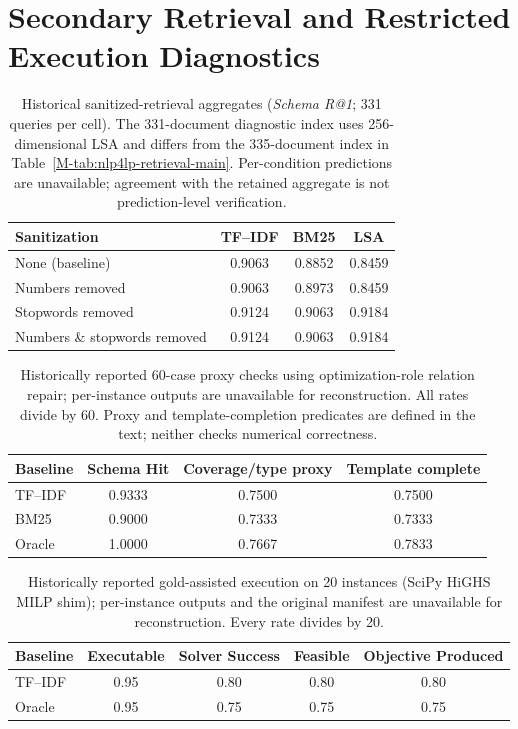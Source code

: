\documentclass[pdflatex,sn-basic,Numbered]{sn-jnl}
\begin{document}
\section{Secondary Retrieval and Restricted Execution Diagnostics}
\begin{table}[htbp]
\centering
\caption{Historical sanitized-retrieval aggregates (\textit{Schema R@1}; 331 queries per cell). The 331-document diagnostic index uses 256-dimensional LSA and differs from the 335-document index in Table~\ref{M-tab:nlp4lp-retrieval-main}. Per-condition predictions are unavailable; agreement with the retained aggregate is not prediction-level verification.}
\label{tab:nlp4lp-overlap}
\small
\begin{tabular}{lccc}
  \toprule
  Sanitization & TF--IDF & BM25 & LSA \\
  \midrule
  None (baseline)               & 0.9063 & 0.8852 & 0.8459 \\
  Numbers removed               & 0.9063 & 0.8973 & 0.8459 \\
  Stopwords removed             & 0.9124 & 0.9063 & 0.9184 \\
  Numbers \& stopwords removed  & 0.9124 & 0.9063 & 0.9184 \\
  \bottomrule
\end{tabular}
\end{table}
\begin{table}[htbp]
\centering
\caption{Historically reported 60-case proxy checks using optimization-role relation repair; per-instance outputs are unavailable for reconstruction. All rates divide by 60. Proxy and template-completion predicates are defined in the text; neither checks numerical correctness.}
\label{tab:eng-structural}
\small
\begin{tabular}{lccc}
  \toprule
  Baseline & Schema Hit & Coverage/type proxy & Template complete \\
  \midrule
  TF--IDF & 0.9333 & 0.7500 & 0.7500 \\
  BM25    & 0.9000 & 0.7333 & 0.7333 \\
  Oracle  & 1.0000 & 0.7667 & 0.7833 \\
  \bottomrule
\end{tabular}
\end{table}
\begin{table}[htbp]
\centering
\caption{Historically reported gold-assisted execution on 20 instances (SciPy HiGHS MILP shim); per-instance outputs and the original manifest are unavailable for reconstruction. Every rate divides by 20.}
\label{tab:eng-solver}
\small
\begin{tabular}{lcccc}
  \toprule
  Baseline & Executable & Solver Success & Feasible & Objective Produced \\
  \midrule
  TF--IDF & 0.95 & 0.80 & 0.80 & 0.80 \\
  Oracle  & 0.95 & 0.75 & 0.75 & 0.75 \\
  \bottomrule
\end{tabular}
\end{table}
\FloatBarrier
\end{document}
